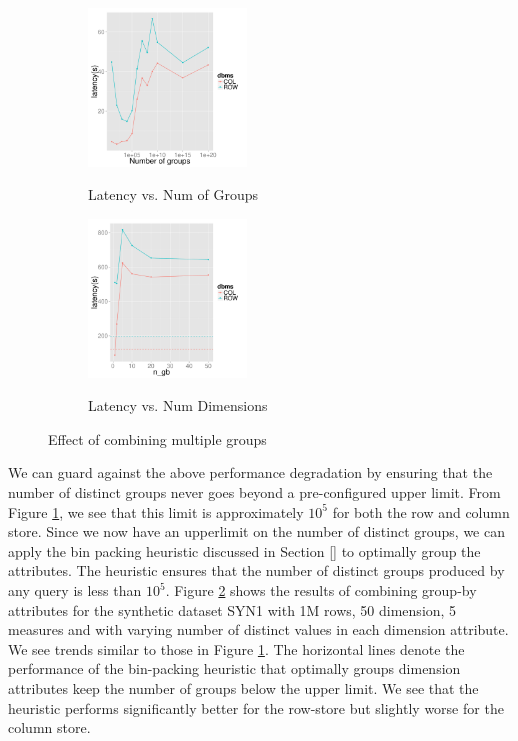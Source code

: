 \begin{figure}[h]
\centering
\begin{subfigure}{0.49\linewidth}
\centering
{\includegraphics[width=4.2cm] {Images/multi_gb_same.pdf}}
\caption{Latency vs. Num of Groups}
\label{fig:multi_gb_same}
\end{subfigure}
\begin{subfigure}{0.49\linewidth}
\centering
{\includegraphics[width=4.2cm] {Images/multi_gb.pdf}}
\caption{Latency vs. Num Dimensions}
\label{fig:multi_gb_bp}
\end{subfigure}
\label{fig:multi_gb}
\caption{Effect of combining multiple groups}
\end{figure}

We can guard against the above performance degradation by ensuring that the
number of distinct groups never goes beyond a pre-configured upper limit.
From Figure \ref{fig:multi_gb_same}, we see that this limit is approximately
$10^5$ for both the row and column store.
Since we now have an upperlimit on the number of distinct groups, we can apply
the bin packing heuristic discussed in Section \ref{} to optimally group the
attributes. 
The heuristic ensures that the number of distinct groups produced by any
query is less than $10^5$. 
Figure \ref{fig:multi_gb_bp} shows the results of combining group-by attributes
for the synthetic dataset SYN1 with  1M rows, 50 dimension, 5 measures and with varying
number of distinct values in each dimension attribute. 
We see trends similar to those in Figure \ref{fig:multi_gb_same}.
The horizontal lines denote the performance of the bin-packing heuristic that
optimally groups dimension attributes keep the number of groups below the
upper limit.
We see that the heuristic performs significantly better for the row-store but
slightly worse for the column store.\\

